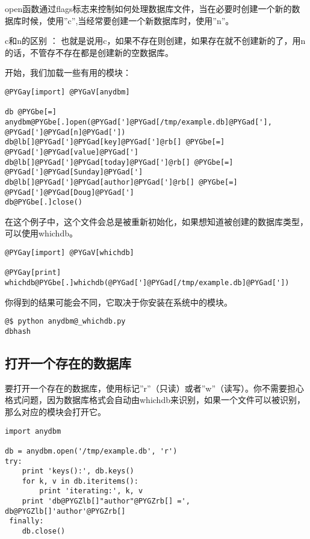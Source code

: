 \documentclass[a4paper,10pt,english]{manual}
\begin{document}
open函数通过flags标志来控制如何处理数据库文件，当在必要时创建一个新的数据库时候，使用''c'',当经常要创建一个新数据库时，使用''n''。

c和n的区别 ：
也就是说用c，如果不存在则创建，如果存在就不创建新的了，用n的话，不管存不存在都是创建新的空数据库。

开始，我们加载一些有用的模块：

\begin{Verbatim}[commandchars=@\[\]]
@PYGay[import] @PYGaV[anydbm]

db @PYGbe[=] anydbm@PYGbe[.]open(@PYGad[']@PYGad[/tmp/example.db]@PYGad['], @PYGad[']@PYGad[n]@PYGad['])
db@lb[]@PYGad[']@PYGad[key]@PYGad[']@rb[] @PYGbe[=] @PYGad[']@PYGad[value]@PYGad[']
db@lb[]@PYGad[']@PYGad[today]@PYGad[']@rb[] @PYGbe[=] @PYGad[']@PYGad[Sunday]@PYGad[']
db@lb[]@PYGad[']@PYGad[author]@PYGad[']@rb[] @PYGbe[=] @PYGad[']@PYGad[Doug]@PYGad[']
db@PYGbe[.]close()
\end{Verbatim}

在这个例子中，这个文件会总是被重新初始化，如果想知道被创建的数据库类型，可以使用whichdb。

\begin{Verbatim}[commandchars=@\[\]]
@PYGay[import] @PYGaV[whichdb]

@PYGay[print] whichdb@PYGbe[.]whichdb(@PYGad[']@PYGad[/tmp/example.db]@PYGad['])
\end{Verbatim}

你得到的结果可能会不同，它取决于你安装在系统中的模块。

\begin{Verbatim}[commandchars=@\[\]]
@$ python anydbm@_whichdb.py
dbhash
\end{Verbatim}


\subsection{打开一个存在的数据库}

要打开一个存在的数据库，使用标记''r''（只读）或者''w''（读写）。你不需要担心格式问题，因为数据库格式会自动由whichdb来识别，如果一个文件可以被识别，那么对应的模块会打开它。

\begin{Verbatim}[commandchars=@\[\]]
import anydbm

db = anydbm.open('/tmp/example.db', 'r')
try:
    print 'keys():', db.keys()
    for k, v in db.iteritems():
        print 'iterating:', k, v
    print 'db@PYGZlb[]"author"@PYGZrb[] =', db@PYGZlb[]'author'@PYGZrb[]
 finally:
    db.close()
\end{Verbatim}
\end{document}
